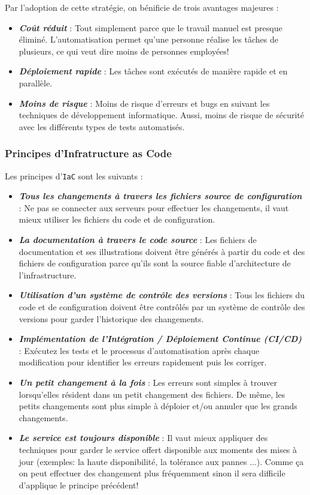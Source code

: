 Par l'adoption de cette stratégie, on bénificie de trois avantages majeures :
\begin{itemize}
  \item\textbf{\emph{Coût réduit}} : Tout simplement parce que le travail manuel est presque éliminé. L'automatisation permet qu'une personne réalise les tâches de plusieurs, ce qui veut dire moins de personnes employées!
  \item\textbf{\emph{Déploiement rapide}} : Les tâches sont exécutés de manière rapide et en parallèle. 
  \item\textbf{\emph{Moins de risque}} : Moins de risque d'erreurs et bugs en suivant les techniques de développement informatique. Aussi, moins de risque de sécurité avec les différents types de tests automatisés.
\end{itemize}

\subsubsection{Principes d'Infratructure as Code}

Les principes d'\texttt{IaC} sont les suivants :
\begin{itemize}
  \item\textbf{\emph{Tous les changements à travers les fichiers source de configuration}} : Ne pas se connecter aux serveurs pour effectuer les changements, il vaut mieux utiliser les fichiers du code et de configuration.
  \item\textbf{\emph{La documentation à travers le code source}} : Les fichiers de documentation et ses illustrations doivent être générés à partir du code et des fichiers de configuration parce qu'ils sont la source fiable d'architecture de l'infrastructure.
  \item\textbf{\emph{Utilisation d'un système de contrôle des versions}} : Tous les fichiers du code et de configuration doivent être contrôlés par un système de contrôle des versions pour garder l'historique des changements.
  \item\textbf{\emph{Implémentation de l'Intégration / Déploiement Continue (CI/CD)}} : Exécutez les tests et le processus d'automatisation après chaque modification pour identifier les erreurs rapidement puis les corriger. 
  \item\textbf{\emph{Un petit changement à la fois}} : Les erreurs sont simples à trouver lorsqu'elles résident dans un petit changement des fichiers. De même, les petits changements sont plus simple à déploier et/ou annuler que les grands changements.
  \item\textbf{\emph{Le service est toujours disponible}} : Il vaut mieux appliquer des techniques pour garder le service offert disponible aux moments des mises à jour (exemples: la haute disponibilité, la tolérance aux pannes ...). Comme ça on peut effectuer des changement plus fréquemment sinon il sera difficile d'applique le principe précédent!
\end{itemize}

